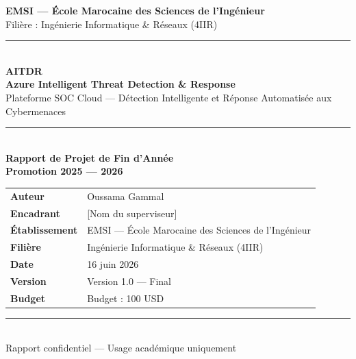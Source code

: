 \documentclass[11pt,a4paper]{report}
\renewcommand{\arraystretch}{1.28}
\begin{document}
\begin{titlepage}
\thispagestyle{empty}
\centering
\vspace*{0.8cm}
{\Large\bfseries EMSI --- École Marocaine des Sciences de l'Ingénieur}\\[0.2cm]
{\normalsize Filière : Ingénierie Informatique \& Réseaux (4IIR)}\\[1.2cm]

{\color{titleblue}\rule{\textwidth}{1.8pt}}\\[0.75cm]
{\Huge\bfseries\color{titleblue} AITDR}\\[0.35cm]
{\Large\bfseries Azure Intelligent Threat Detection \& Response}\\[0.45cm]
{\large Plateforme SOC Cloud --- Détection Intelligente et Réponse Automatisée aux Cybermenaces}\\[0.75cm]
{\color{titleblue}\rule{0.72\textwidth}{0.7pt}}\\[1.0cm]

{\Large\bfseries Rapport de Projet de Fin d'Année}\\[0.35cm]
{\large\bfseries Promotion 2025 --- 2026}\\[1.5cm]

\begin{mdframed}[
  backgroundcolor=infobox,
  linecolor=titleblue,
  linewidth=0.8pt,
  roundcorner=4pt,
  innerleftmargin=18pt,
  innerrightmargin=18pt,
  innertopmargin=12pt,
  innerbottommargin=12pt
]
\renewcommand{\arraystretch}{1.25}
\begin{tabularx}{0.82\textwidth}{@{}L{3.5cm}Y@{}}
\textbf{Auteur} & Oussama Gammal \\
\textbf{Encadrant} & [Nom du superviseur] \\
\textbf{Établissement} & EMSI --- École Marocaine des Sciences de l'Ingénieur \\
\textbf{Filière} & Ingénierie Informatique \& Réseaux (4IIR) \\
\textbf{Date} & 16 juin 2026 \\
\textbf{Version} & Version 1.0 --- Final \\
\textbf{Budget} & Budget : 100 USD \\
\end{tabularx}
\end{mdframed}
\vfill
{\color{titleblue}\rule{\textwidth}{0.5pt}}\\[0.25cm]
{\small Rapport confidentiel --- Usage académique uniquement}
\end{titlepage}
\end{document}
